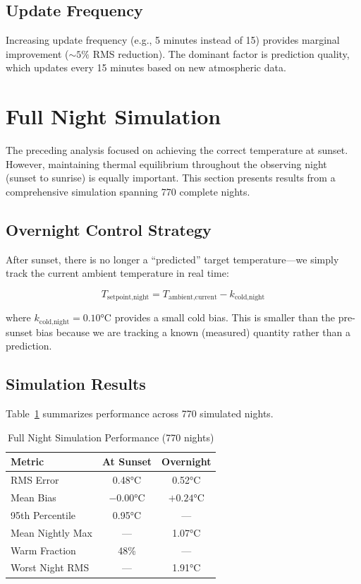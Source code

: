 \documentclass[11pt,letterpaper]{article}
\begin{document}
\subsection{Update Frequency}

Increasing update frequency (e.g., 5 minutes instead of 15) provides marginal improvement ($\sim 5\%$ RMS reduction). The dominant factor is prediction quality, which updates every 15 minutes based on new atmospheric data.

\section{Full Night Simulation}

The preceding analysis focused on achieving the correct temperature at sunset. However, maintaining thermal equilibrium throughout the observing night (sunset to sunrise) is equally important. This section presents results from a comprehensive simulation spanning 770 complete nights.

\subsection{Overnight Control Strategy}

After sunset, there is no longer a ``predicted'' target temperature---we simply track the current ambient temperature in real time:

\begin{equation}
T_{\text{setpoint,night}} = T_{\text{ambient,current}} - k_{\text{cold,night}}
\label{eq:overnight}
\end{equation}

where $k_{\text{cold,night}} = 0.10$°C provides a small cold bias. This is smaller than the pre-sunset bias because we are tracking a known (measured) quantity rather than a prediction.

\subsection{Simulation Results}

Table~\ref{tab:fullnight} summarizes performance across 770 simulated nights.

\begin{table}[h]
\centering
\caption{Full Night Simulation Performance (770 nights)}
\begin{tabular}{lcc}
\toprule
\textbf{Metric} & \textbf{At Sunset} & \textbf{Overnight} \\
\midrule
RMS Error & 0.48°C & 0.52°C \\
Mean Bias & $-0.00$°C & $+0.24$°C \\
95th Percentile & 0.95°C & --- \\
Mean Nightly Max & --- & 1.07°C \\
Warm Fraction & 48\% & --- \\
Worst Night RMS & --- & 1.91°C \\
\bottomrule
\end{tabular}
\label{tab:fullnight}
\end{table}
\end{document}
